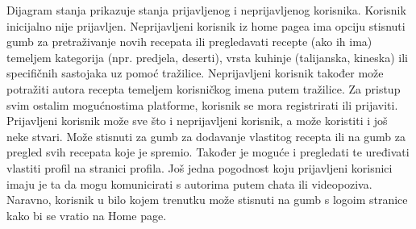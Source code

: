 		\noindent Dijagram stanja prikazuje stanja prijavljenog i neprijavljenog korisnika. Korisnik inicijalno nije prijavljen. Neprijavljeni korisnik iz home pagea ima opciju stisnuti gumb za pretraživanje novih recepata ili pregledavati recepte (ako ih ima) temeljem kategorija (npr. predjela, deserti), vrsta kuhinje (talijanska, kineska) ili specifičnih sastojaka uz pomoć tražilice. Neprijavljeni korisnik također može potražiti autora recepta temeljem korisničkog imena putem tražilice. Za pristup svim ostalim mogućnostima platforme, korisnik se mora registrirati ili prijaviti. Prijavljeni korisnik može sve što i neprijavljeni korisnik, a može koristiti i još neke stvari. Može stisnuti za gumb za dodavanje vlastitog recepta ili na gumb za pregled svih recepata koje je spremio. Također je moguće i pregledati te uređivati vlastiti profil na stranici profila. Još jedna pogodnost koju prijavljeni korisnici imaju je ta da mogu komunicirati s autorima putem chata ili videopoziva. Naravno, korisnik u bilo kojem trenutku može stisnuti na gumb s logoim stranice kako bi se vratio na Home page. 

		\eject
			
